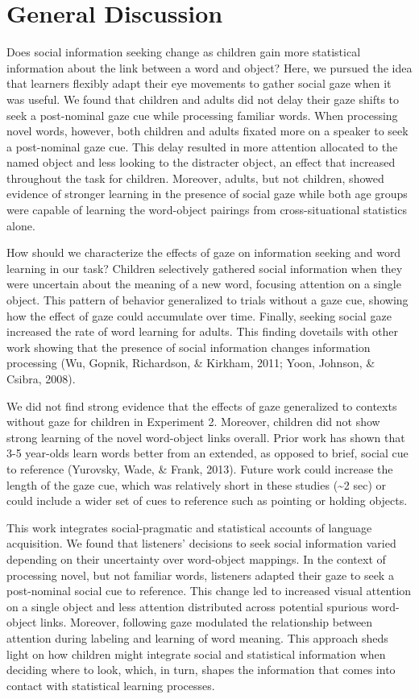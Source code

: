 \documentclass[10pt, letterpaper]{article}
\begin{document}
\hypertarget{general-discussion}{%
\section{General Discussion}\label{general-discussion}}

Does social information seeking change as children gain more statistical
information about the link between a word and object? Here, we pursued
the idea that learners flexibly adapt their eye movements to gather
social gaze when it was useful. We found that children and adults did
not delay their gaze shifts to seek a post-nominal gaze cue while
processing familiar words. When processing novel words, however, both
children and adults fixated more on a speaker to seek a post-nominal
gaze cue. This delay resulted in more attention allocated to the named
object and less looking to the distracter object, an effect that
increased throughout the task for children. Moreover, adults, but not
children, showed evidence of stronger learning in the presence of social
gaze while both age groups were capable of learning the word-object
pairings from cross-situational statistics alone.

How should we characterize the effects of gaze on information seeking
and word learning in our task? Children selectively gathered social
information when they were uncertain about the meaning of a new word,
focusing attention on a single object. This pattern of behavior
generalized to trials without a gaze cue, showing how the effect of gaze
could accumulate over time. Finally, seeking social gaze increased the
rate of word learning for adults. This finding dovetails with other work
showing that the presence of social information changes information
processing (Wu, Gopnik, Richardson, \& Kirkham, 2011; Yoon, Johnson, \&
Csibra, 2008).

We did not find strong evidence that the effects of gaze generalized to
contexts without gaze for children in Experiment 2. Moreover, children
did not show strong learning of the novel word-object links overall.
Prior work has shown that 3-5 year-olds learn words better from an
extended, as opposed to brief, social cue to reference (Yurovsky, Wade,
\& Frank, 2013). Future work could increase the length of the gaze cue,
which was relatively short in these studies (\textasciitilde{}2 sec) or
could include a wider set of cues to reference such as pointing or
holding objects.

This work integrates social-pragmatic and statistical accounts of
language acquisition. We found that listeners' decisions to seek social
information varied depending on their uncertainty over word-object
mappings. In the context of processing novel, but not familiar words,
listeners adapted their gaze to seek a post-nominal social cue to
reference. This change led to increased visual attention on a single
object and less attention distributed across potential spurious
word-object links. Moreover, following gaze modulated the relationship
between attention during labeling and learning of word meaning. This
approach sheds light on how children might integrate social and
statistical information when deciding where to look, which, in turn,
shapes the information that comes into contact with statistical learning
processes.
\end{document}
